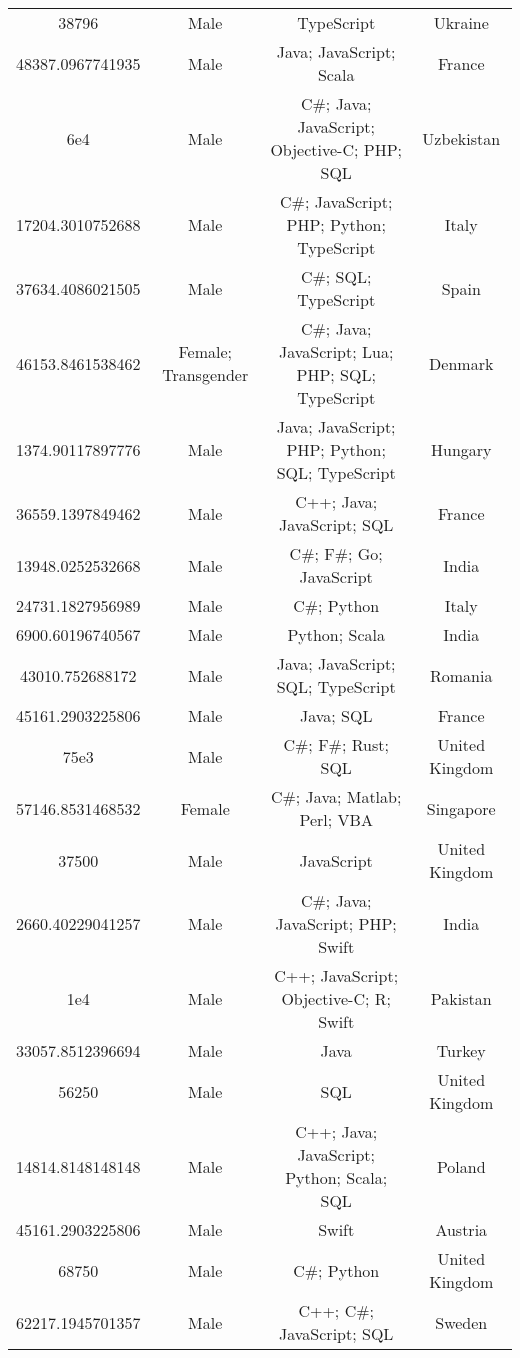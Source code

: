 \begin{center}
\begin{tabular}{ |c|c|c|c| }
38796  &  Male  &  TypeScript  &  Ukraine  \\ 
48387.0967741935  &  Male  &  Java; JavaScript; Scala  &  France  \\ 
6e4  &  Male  &  C\#; Java; JavaScript; Objective-C; PHP; SQL  &  Uzbekistan  \\ 
17204.3010752688  &  Male  &  C\#; JavaScript; PHP; Python; TypeScript  &  Italy  \\ 
37634.4086021505  &  Male  &  C\#; SQL; TypeScript  &  Spain  \\ 
46153.8461538462  &  Female; Transgender  &  C\#; Java; JavaScript; Lua; PHP; SQL; TypeScript  &  Denmark  \\ 
1374.90117897776  &  Male  &  Java; JavaScript; PHP; Python; SQL; TypeScript  &  Hungary  \\ 
36559.1397849462  &  Male  &  C++; Java; JavaScript; SQL  &  France  \\ 
13948.0252532668  &  Male  &  C\#; F\#; Go; JavaScript  &  India  \\ 
24731.1827956989  &  Male  &  C\#; Python  &  Italy  \\ 
6900.60196740567  &  Male  &  Python; Scala  &  India  \\ 
43010.752688172  &  Male  &  Java; JavaScript; SQL; TypeScript  &  Romania  \\ 
45161.2903225806  &  Male  &  Java; SQL  &  France  \\ 
75e3  &  Male  &  C\#; F\#; Rust; SQL  &  United Kingdom  \\ 
57146.8531468532  &  Female  &  C\#; Java; Matlab; Perl; VBA  &  Singapore  \\ 
37500  &  Male  &  JavaScript  &  United Kingdom  \\ 
2660.40229041257  &  Male  &  C\#; Java; JavaScript; PHP; Swift  &  India  \\ 
1e4  &  Male  &  C++; JavaScript; Objective-C; R; Swift  &  Pakistan  \\ 
33057.8512396694  &  Male  &  Java  &  Turkey  \\ 
56250  &  Male  &  SQL  &  United Kingdom  \\ 
14814.8148148148  &  Male  &  C++; Java; JavaScript; Python; Scala; SQL  &  Poland  \\ 
45161.2903225806  &  Male  &  Swift  &  Austria  \\ 
68750  &  Male  &  C\#; Python  &  United Kingdom  \\ 
62217.1945701357  &  Male  &  C++; C\#; JavaScript; SQL  &  Sweden  \\ 

\end{tabular}
\end{center}
